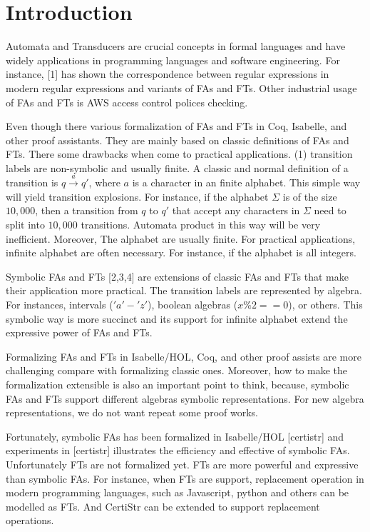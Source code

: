 \documentclass[a4paper,UKenglish,cleveref, autoref, thm-restate]{lipics-v2021}
\begin{document}
\section{Introduction}
\label{sec:introduction}

Automata and Transducers are crucial concepts in formal languages and have widely applications in programming languages and software engineering. For instance, [1] has shown the correspondence between  regular expressions in modern regular expressions and variants of FAs and FTs. Other industrial usage of FAs and FTs is AWS access control polices checking.


Even though there various  formalization of FAs and FTs in Coq, Isabelle, and other proof assistants. They are mainly based on classic definitions of FAs and FTs.  There some drawbacks when come to practical applications. (1) transition labels are 
non-symbolic and usually finite.
A classic and normal definition of a transition is $q\xrightarrow{a}q'$, where $a$ is a character in an finite alphabet.  This simple way will yield transition explosions. 
For instance, if the alphabet $\Sigma$ is of the size $10,000$, then a transition from $q$ to $q'$ that accept any characters in $\Sigma$ need to split into $10,000$ transitions. Automata product in this way will be very inefficient. Moreover, 
The alphabet are usually finite. For practical applications, infinite alphabet are often necessary. For instance, if the alphabet is all integers. 



Symbolic FAs and FTs [2,3,4] are extensions of classic FAs and FTs that make their application more practical. The transition labels are represented by algebra. For instances, intervals ($'a'-'z'$), boolean algebras ($x \% 2 == 0$), or others. This symbolic way is more succinct and its support for infinite alphabet extend the expressive power of FAs and FTs.

Formalizing FAs and FTs in Isabelle/HOL, Coq, and other proof assists are more challenging compare with formalizing classic ones. Moreover, how to make the formalization extensible is also an important point to think, because, symbolic FAs and FTs support different algebras symbolic representations. For new algebra representations, we do not want repeat some proof works.


Fortunately, symbolic FAs has been formalized in Isabelle/HOL [certistr] and experiments in [certistr] illustrates the efficiency and effective of symbolic FAs. Unfortunately FTs are not formalized yet.  FTs are more powerful and expressive than symbolic FAs. For instance, when FTs are support, replacement operation in modern programming languages, such as Javascript, python and others can be modelled as FTs. And CertiStr can be extended to support replacement operations.
\end{document}
